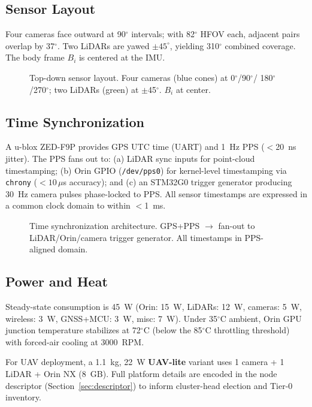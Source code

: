 \subsection{Sensor Layout}

Four cameras face outward at 90$^\circ$ intervals; with 82$^\circ$ HFOV each,
adjacent pairs overlap by 37$^\circ$. Two LiDARs are yawed $\pm 45^\circ$,
yielding 310$^\circ$ combined coverage. The body frame $B_i$ is centered at
the IMU.

\begin{figure}[t]
  \centering
  \resizebox{\columnwidth}{!}{}
  \caption{Top-down sensor layout. Four cameras (blue cones) at 0$^\circ$/90$^\circ$/
  180$^\circ$/270$^\circ$; two LiDARs (green) at $\pm$45$^\circ$. $B_i$ at center.}
  \label{fig:layout}
\end{figure}

\subsection{Time Synchronization}

A u-blox ZED-F9P provides GPS UTC time (UART) and 1~Hz PPS ($<$20~ns jitter).
The PPS fans out to: (a) LiDAR sync inputs for point-cloud timestamping;
(b) Orin GPIO (\texttt{/dev/pps0}) for kernel-level timestamping via
\texttt{chrony} ($<10\,\mu$s accuracy); and (c) an STM32G0 trigger
generator producing 30~Hz camera pulses phase-locked to PPS. All sensor
timestamps are expressed in a common clock domain to within $<$1~ms.

\begin{figure}[t]
  \centering
  \resizebox{\columnwidth}{!}{}
  \caption{Time synchronization architecture. GPS+PPS $\to$ fan-out to
  LiDAR/Orin/camera trigger generator. All timestamps in PPS-aligned domain.}
  \label{fig:time_sync}
\end{figure}

\subsection{Power and Heat}

Steady-state consumption is 45~W (Orin: 15~W, LiDARs: 12~W, cameras: 5~W,
wireless: 3~W, GNSS+MCU: 3~W, misc: 7~W). Under 35$^\circ$C ambient, Orin
GPU junction temperature stabilizes at 72$^\circ$C (below the 85$^\circ$C
throttling threshold) with forced-air cooling at 3000~RPM.

For UAV deployment, a 1.1~kg, 22~W \textbf{UAV-lite} variant uses 1 camera
+ 1 LiDAR + Orin NX (8~GB). Full platform details are encoded in the node
descriptor (Section~\ref{sec:descriptor}) to inform cluster-head election
and Tier-0 inventory.
